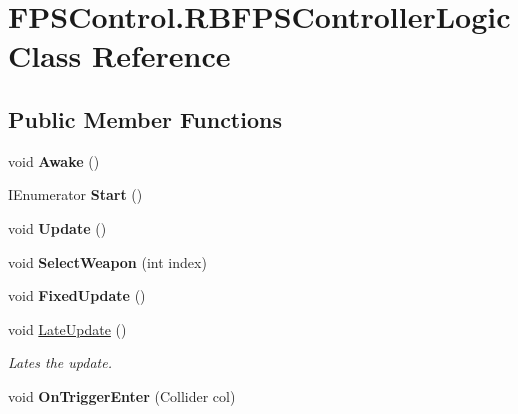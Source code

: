 \hypertarget{class_f_p_s_control_1_1_r_b_f_p_s_controller_logic}{\section{F\-P\-S\-Control.\-R\-B\-F\-P\-S\-Controller\-Logic Class Reference}
\label{class_f_p_s_control_1_1_r_b_f_p_s_controller_logic}
}
\subsection*{Public Member Functions}
\begin{DoxyCompactItemize}
\item 
\hypertarget{class_f_p_s_control_1_1_r_b_f_p_s_controller_logic_a4b8074104807efb2921470c42a66979a}{void {\bfseries Awake} ()}\label{class_f_p_s_control_1_1_r_b_f_p_s_controller_logic_a4b8074104807efb2921470c42a66979a}

\item 
\hypertarget{class_f_p_s_control_1_1_r_b_f_p_s_controller_logic_ac8e13ef5ec6a6379846a7de99f460633}{I\-Enumerator {\bfseries Start} ()}\label{class_f_p_s_control_1_1_r_b_f_p_s_controller_logic_ac8e13ef5ec6a6379846a7de99f460633}

\item 
\hypertarget{class_f_p_s_control_1_1_r_b_f_p_s_controller_logic_a3923ed5bd871d51d60851587606d7111}{void {\bfseries Update} ()}\label{class_f_p_s_control_1_1_r_b_f_p_s_controller_logic_a3923ed5bd871d51d60851587606d7111}

\item 
\hypertarget{class_f_p_s_control_1_1_r_b_f_p_s_controller_logic_abfd6768f0088bd4b37360c3f1e41f419}{void {\bfseries Select\-Weapon} (int index)}\label{class_f_p_s_control_1_1_r_b_f_p_s_controller_logic_abfd6768f0088bd4b37360c3f1e41f419}

\item 
\hypertarget{class_f_p_s_control_1_1_r_b_f_p_s_controller_logic_a278ea01fe3997ff67b4f0092606a35aa}{void {\bfseries Fixed\-Update} ()}\label{class_f_p_s_control_1_1_r_b_f_p_s_controller_logic_a278ea01fe3997ff67b4f0092606a35aa}

\item 
void \hyperlink{class_f_p_s_control_1_1_r_b_f_p_s_controller_logic_a36eed34d17eadd0a73a9ecfca43f5473}{Late\-Update} ()
\begin{DoxyCompactList}\small\item\em Lates the update. \end{DoxyCompactList}\item 
\hypertarget{class_f_p_s_control_1_1_r_b_f_p_s_controller_logic_ab891e2eb18bee6854ca985a0d2e8f8fe}{void {\bfseries On\-Trigger\-Enter} (Collider col)}\label{class_f_p_s_control_1_1_r_b_f_p_s_controller_logic_ab891e2eb18bee6854ca985a0d2e8f8fe}


\end{DoxyCompactItemize}
